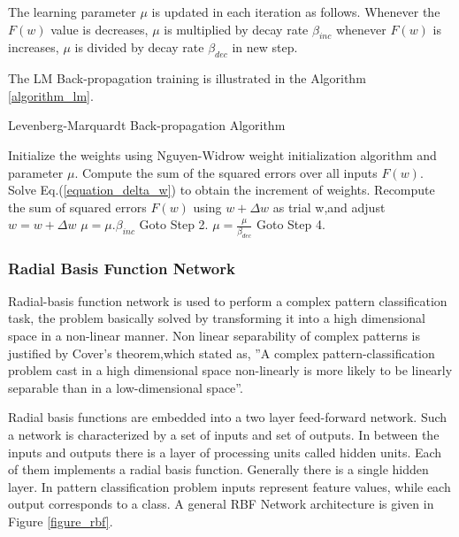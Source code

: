 \documentclass[12pt,a4paper,oneside]{article}
\numberwithin{equation}{section}
\numberwithin{algorithm}{section}
\begin{document}
	The learning parameter $\mu$ is updated in each iteration as follows. Whenever the $F(w)$ value is decreases, $\mu$ is multiplied by decay rate $\beta_{inc}$ whenever $F(w)$ is increases, $\mu$ is divided by decay rate $\beta_{dec}$ in new step.
	
	The LM Back-propagation training is illustrated in the Algorithm \ref{algorithm_lm}.
	
	\begin{algorithm}
	\caption{Levenberg-Marquardt Back-propagation Algorithm}
	\label{algorithm_lm}
	\begin{algorithmic}[1]
	\STATE Initialize the weights using Nguyen-Widrow weight initialization algorithm and parameter $\mu$.
	\STATE Compute the sum of the squared errors over all inputs $F(w)$.
	\STATE Solve Eq.(\ref{equation_delta_w}) to obtain the increment of weights.
	\STATE Recompute the sum of squared errors $F(w)$ using $w+\Delta{w}$ as trial w,and adjust
	\STATE $w=w+\Delta{w}$
	\STATE $\mu=\mu.\beta_{inc}$
	\STATE Goto Step 2.
	\ELSE
	\STATE $\mu=\frac{\mu}{\beta_{dec}}$
	\STATE  Goto Step 4.
	\ENDIF
	\end{algorithmic}
	\end{algorithm}
	
	\newpage
	\subsubsection{Radial Basis Function Network}
	\label{radial_basis_function}
	
	Radial-basis function network is used to perform a complex pattern classification task, the problem basically solved by transforming it into a high dimensional space in a non-linear manner. Non linear separability of complex patterns is justified by Cover's theorem,which stated as, ''A complex pattern-classification problem cast in a high dimensional space non-linearly is more likely to be linearly separable than in a low-dimensional space''.
	
	Radial basis functions are embedded into a two layer feed-forward network. Such a  network is characterized by a set of inputs and set of outputs. In between the inputs and outputs there is a layer of processing units called hidden units. Each of them implements a radial basis function. Generally there is a single hidden layer. In pattern classification problem inputs represent feature values, while each output corresponds to a class. A general RBF Network architecture is given in Figure \ref{figure_rbf}.
	
\end{document}

